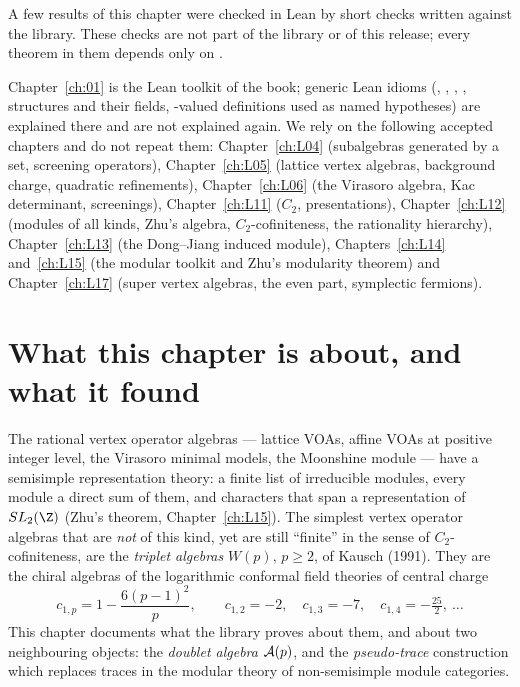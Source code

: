 A few results of this chapter were checked in Lean by short checks written against the library. These
checks are not part of the library or of this release; every theorem in them depends only on
.

Chapter~\ref{ch:01} is the Lean toolkit of the book; generic Lean idioms (,
, , , structures and their fields, -valued
definitions used as named hypotheses) are explained there and are not explained again. We rely on
the following accepted chapters and do not repeat them: Chapter~\ref{ch:L04} (subalgebras
generated by a set, screening operators), Chapter~\ref{ch:L05} (lattice vertex algebras,
background charge, quadratic refinements), Chapter~\ref{ch:L06} (the Virasoro algebra, Kac
determinant, screenings), Chapter~\ref{ch:L11} ($C_2$, presentations), Chapter~\ref{ch:L12}
(modules of all kinds, Zhu's algebra, $C_2$-cofiniteness, the rationality hierarchy),
Chapter~\ref{ch:L13} (the Dong--Jiang induced module), Chapters~\ref{ch:L14}
and~\ref{ch:L15} (the modular toolkit and Zhu's modularity theorem) and Chapter~\ref{ch:L17} (super
vertex algebras, the even part, symplectic fermions).

\section{What this chapter is about, and what it found}\label{l18:sec:intro}

The rational vertex operator algebras --- lattice VOAs, affine VOAs at positive integer level,
the Virasoro minimal models, the Moonshine module --- have a semisimple representation theory: a
finite list of irreducible modules, every module a direct sum of them, and characters that span a
representation of $SL_2(\Z)$ (Zhu's theorem, Chapter~\ref{ch:L15}). The simplest vertex operator
algebras that are \emph{not} of this kind, yet are still ``finite'' in the sense of
$C_2$-cofiniteness, are the \emph{triplet algebras} $W(p)$, $p\ge2$, of Kausch (1991). They are
the chiral algebras of the logarithmic conformal field theories of central charge
\begin{equation}\label{l18:eq:cp}
c_{1,p}=1-\frac{6(p-1)^2}{p},\qquad c_{1,2}=-2,\quad c_{1,3}=-7,\quad c_{1,4}=-\tfrac{25}{2},\ \dots
\end{equation}
This chapter documents what the library proves about them, and about two neighbouring objects:
the \emph{doublet algebra} $\mathcal{A}(p)$, and the \emph{pseudo-trace} construction which replaces
traces in the modular theory of non-semisimple module categories.

